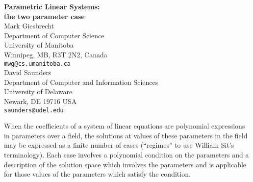 \setlength{\textwidth}{6.5in}
\setlength{\textheight}{9in}
\setlength{\oddsidemargin}{0pt}
\setlength{\evensidemargin}{0pt}
\setlength{\topmargin}{-.5in}



\begin{center}
\large{\bf Parametric Linear Systems:\\
the two parameter case} \\[10pt]
Mark Giesbrecht\\
Department of Computer Science\\
University of Manitoba\\
Winnipeg, MB, R3T 2N2, Canada\\
\verb|mwg@cs.umanitoba.ca|\\[5pt]
David Saunders \\
Department of Computer and Information Sciences \\
University of Delaware \\
Newark, DE 19716 USA\\
\verb|saunders@udel.edu|
\end{center}

\newcommand{\F}{{\mathsf F}}
\newcommand{\ints}{{\mathbf Z}}
\newcommand{\mxn}{{m\times n}}
\newcommand{\nx}[1]{{n\times #1}}
\newcommand{\mx}[1]{{m\times #1}}
\newcommand{\rx}[1]{{r\times #1}}
\newcommand{\nequiv}{{\mskip4mu\not\equiv\mskip4mu}}
\def\nin{{\mathrel{\hbox{$\mskip4mu\not\in\mskip4mu$}}}}

When the coefficients of a system of linear equations are polynomial
expressions in parameters over a field, the solutions at values of
these parameters in the field may be expressed as a finite number of
cases (``regimes'' to use William Sit's terminology).  Each case
involves a polynomial condition on the parameters and a description of
the solution space which involves the parameters and is applicable for
those values of the parameters which satisfy the condition.

